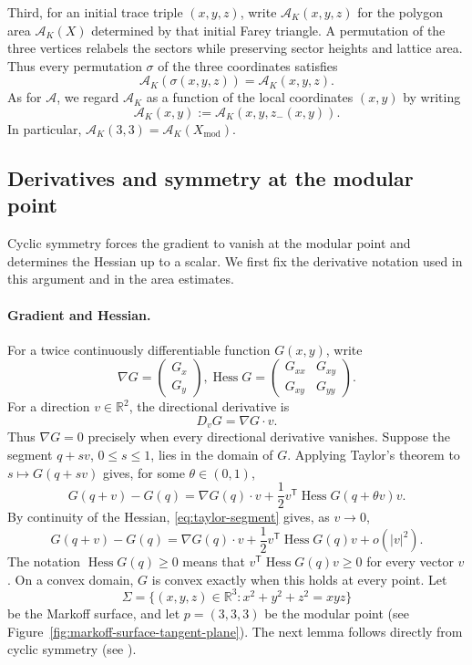 \documentclass[10pt,twoside]{article}
\theoremstyle{plain}
\theoremstyle{definition}
\theoremstyle{remark}
\DeclareMathOperator{\Hess}{Hess}
\newcommand{\A}{\mathcal A}
\newcommand{\R}{\mathbb R}
\newcommand{\Xmod}{X_{\mathrm{mod}}}
\begin{document}
Third, for an initial trace triple $(x,y,z)$, write $\A_K(x,y,z)$ for
the polygon area $\A_K(X)$ determined by that initial Farey triangle.
A permutation of the three vertices relabels the sectors while preserving
sector heights and lattice area. Thus every permutation $\sigma$ of the
three coordinates satisfies
\begin{equation*}
\A_K(\sigma(x,y,z))=\A_K(x,y,z).
\end{equation*}
As for $\A$, we regard $\A_K$ as a function of the local coordinates
$(x,y)$ by writing
$$
\A_K(x,y):=\A_K(x,y,z_-(x,y)).
$$
In particular, $\A_K(3,3)=\A_K(\Xmod)$.

\subsection{Derivatives and symmetry at the modular point}
\label{sec:differential-tools}
Cyclic symmetry forces the gradient to vanish at the modular point
and determines the Hessian up to a scalar. We first fix the derivative
notation used in this argument and in the area estimates.
\paragraph{Gradient and Hessian.}
For a twice continuously differentiable function $G(x,y)$, write
$$
\nabla G=
\begin{pmatrix}
G_x\\
G_y
\end{pmatrix},
\Hess G=
\begin{pmatrix}
G_{xx}&G_{xy}\\
G_{xy}&G_{yy}
\end{pmatrix}.
$$
For a direction $v\in\R^2$, the directional derivative is
$$
D_vG=\nabla G\cdot v.
$$
Thus $\nabla G=0$ precisely when every directional derivative vanishes. Suppose the segment $q+sv$, $0\leq s\leq1$, lies in the
domain of $G$. Applying Taylor's theorem \cite[Theorem~5.15]{Rudin}
to $s\mapsto G(q+sv)$ gives, for some $\theta\in(0,1)$,
\begin{equation}
\label{eq:taylor-segment}
G(q+v)-G(q)
=\nabla G(q)\cdot v+\frac12v^{\mathsf T}\Hess G(q+\theta v)v.
\end{equation}
By continuity of the Hessian, \eqref{eq:taylor-segment} gives, as $v\to0$,
\begin{equation}
\label{eq:taylor-quadratic}
G(q+v)-G(q)
=\nabla G(q)\cdot v+\frac12v^{\mathsf T}\Hess G(q)v+o(|v|^2).
\end{equation}
The notation $\Hess G(q)\geq0$ means that
$v^{\mathsf T}\Hess G(q)v\geq0$ for every vector $v$.
On a convex domain, $G$ is convex exactly when this holds at every point.
Let
$$
\Sigma
=
\{(x,y,z)\in\R^3:x^2+y^2+z^2=xyz\}
$$
be the Markoff surface, and let
$
p=(3,3,3)
$
be the modular point (see Figure~\ref{fig:markoff-surface-tangent-plane}).
The next lemma follows directly from cyclic symmetry
(see \cite{Palais1979}).
\end{document}
